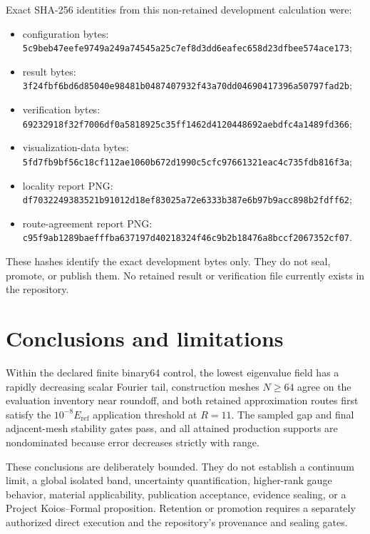 \documentclass[11pt]{article}
\begin{document}
Exact SHA-256 identities from this non-retained development calculation were:
\begin{itemize}
\item configuration bytes: \nolinkurl{5c9beb47eefe9749a249a74545a25c7ef8d3dd6eafec658d23dfbee574ace173};
\item result bytes: \nolinkurl{3f24fbf6bd6d85040e98481b0487407932f43a70dd04690417396a50797fad2b};
\item verification bytes: \nolinkurl{69232918f32f7006df0a5818925c35ff1462d4120448692aebdfc4a1489fd366};
\item visualization-data bytes: \nolinkurl{5fd7fb9bf56c18cf112ae1060b672d1990c5cfc97661321eac4c735fdb816f3a};
\item locality report PNG: \nolinkurl{df7032249383521b91012d18ef83025a72e6333b387e6b97b9acc898b2fdff62};
\item route-agreement report PNG: \nolinkurl{c95f9ab1289baefffba637197d40218324f46c9b2b18476a8bccf2067352cf07}.
\end{itemize}
These hashes identify the exact development bytes only.  They do not seal, promote, or
publish them.  No retained result or verification file currently exists in the
repository.

\section{Conclusions and limitations}

Within the declared finite binary64 control, the lowest eigenvalue field has a rapidly
decreasing scalar Fourier tail, construction meshes $N\ge64$ agree on the evaluation
inventory near roundoff, and both retained approximation routes first satisfy the
$10^{-8}E_{\mathrm{ref}}$ application threshold at $R=11$.  The sampled gap and final
adjacent-mesh stability gates pass, and all attained production supports are
nondominated because error decreases strictly with range.

These conclusions are deliberately bounded.  They do not establish a continuum limit,
a global isolated band, uncertainty quantification, higher-rank gauge behavior,
material applicability, publication acceptance, evidence sealing, or a Project
Koios--Formal proposition.  Retention or promotion requires a separately authorized
direct execution and the repository's provenance and sealing gates.
\end{document}
